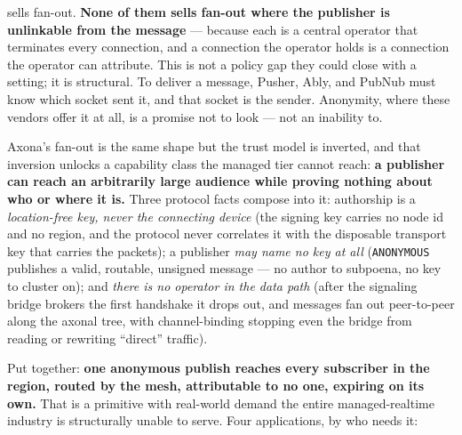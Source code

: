 \documentclass[nobib]{tufte-handout}
\begin{document}
 sells fan-out.
\textbf{None of them sells fan-out where the publisher is unlinkable from
the message} --- because each is a central operator that terminates every
connection, and a connection the operator holds is a connection the
operator can attribute. This is not a policy gap they could close with a
setting; it is structural. To deliver a message, Pusher, Ably, and PubNub
must know which socket sent it, and that socket is the sender. Anonymity,
where these vendors offer it at all, is a promise not to look --- not an
inability to.

Axona's fan-out is the same shape but the trust model is inverted, and
that inversion unlocks a capability class the managed tier cannot reach:
\textbf{a publisher can reach an arbitrarily large audience while proving
nothing about who or where it is.} Three protocol facts compose into it:
authorship is a \emph{location-free key, never the connecting device}
(the signing key carries no node id and no region, and the protocol never
correlates it with the disposable transport key that carries the
packets); a publisher \emph{may name no key at all} (\texttt{ANONYMOUS}
publishes a valid, routable, unsigned message --- no author to subpoena,
no key to cluster on); and \emph{there is no operator in the data path} (after the
signaling bridge brokers the first handshake it drops out, and messages
fan out peer-to-peer along the axonal tree, with channel-binding stopping
even the bridge from reading or rewriting ``direct'' traffic).

Put together: \textbf{one anonymous publish reaches every subscriber in
the region, routed by the mesh, attributable to no one, expiring on its
own.} That is a primitive with real-world demand the entire
managed-realtime industry is structurally unable to serve. Four
applications, by who needs it:
\end{document}
